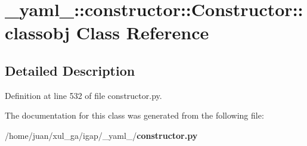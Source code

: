 \section{\_\-yaml\_\-::constructor::Constructor::classobj Class Reference}
\label{class__yaml___1_1constructor_1_1Constructor_1_1classobj}


\subsection{Detailed Description}


Definition at line 532 of file constructor.py.

The documentation for this class was generated from the following file:\begin{CompactItemize}
\item 
/home/juan/xul\_\-ga/igap/\_\-yaml\_\-/{\bf constructor.py}\end{CompactItemize}
